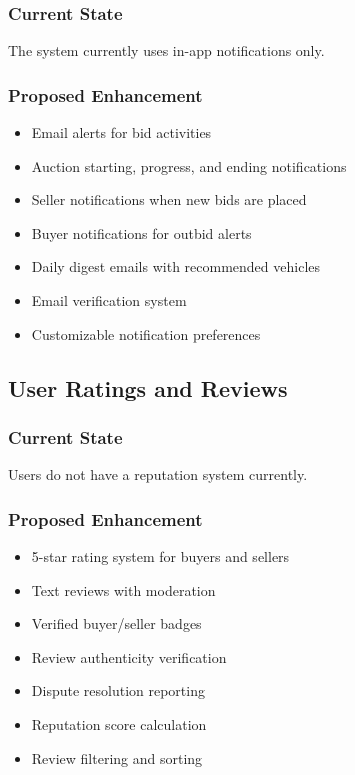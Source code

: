 \subsubsection{Current State}
The system currently uses in-app notifications only.

\subsubsection{Proposed Enhancement}
\begin{itemize}
    \item Email alerts for bid activities
    \item Auction starting, progress, and ending notifications
    \item Seller notifications when new bids are placed
    \item Buyer notifications for outbid alerts
    \item Daily digest emails with recommended vehicles
    \item Email verification system
    \item Customizable notification preferences
\end{itemize}

\subsection{User Ratings and Reviews}

\subsubsection{Current State}
Users do not have a reputation system currently.

\subsubsection{Proposed Enhancement}
\begin{itemize}
    \item 5-star rating system for buyers and sellers
    \item Text reviews with moderation
    \item Verified buyer/seller badges
    \item Review authenticity verification
    \item Dispute resolution reporting
    \item Reputation score calculation
    \item Review filtering and sorting
\end{itemize}

